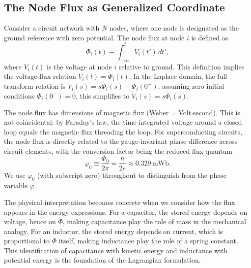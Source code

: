 \documentclass[reprint, floatfix, superscriptaddress, amsmath, amssymb, longbibliography]{revtex4-2}
\begin{document}
\subsection{The Node Flux as Generalized Coordinate}
\label{sec:node_flux}

Consider a circuit network with $N$ nodes, where one node is designated as the ground reference with zero potential. The node flux at node $i$ is defined as
\begin{equation}
\Phi_i(t) \equiv \int_{-\infty}^{t} V_i(t') \, dt',
\label{eq:node_flux_def}
\end{equation}
where $V_i(t)$ is the voltage at node $i$ relative to ground. This definition implies the voltage-flux relation $V_i(t) = \dot{\Phi}_i(t)$. In the Laplace domain, the full transform relation is $\tilde{V}_i(s) = s \tilde{\Phi}_i(s) - \Phi_i(0^-)$; assuming zero initial conditions $\Phi_i(0^-) = 0$, this simplifies to $\tilde{V}_i(s) = s \tilde{\Phi}_i(s)$.

The node flux has dimensions of magnetic flux (Weber = Volt$\cdot$second). This is not coincidental: by Faraday's law, the time-integrated voltage around a closed loop equals the magnetic flux threading the loop. For superconducting circuits, the node flux is directly related to the gauge-invariant phase difference across circuit elements, with the conversion factor being the reduced flux quantum
\begin{equation}
\varphi_0 \equiv \frac{\Phi_0}{2\pi} = \frac{\hbar}{2e} \approx 0.329\,\mathrm{mWb}.
\label{eq:reduced_flux_quantum}
\end{equation}
We use $\varphi_0$ (with subscript zero) throughout to distinguish from the phase variable $\varphi$.

The physical interpretation becomes concrete when we consider how the flux appears in the energy expressions. For a capacitor, the stored energy depends on voltage, hence on $\dot{\Phi}$, making capacitance play the role of mass in the mechanical analogy. For an inductor, the stored energy depends on current, which is proportional to $\Phi$ itself, making inductance play the role of a spring constant. This identification of capacitance with kinetic energy and inductance with potential energy is the foundation of the Lagrangian formulation.

\end{document}

